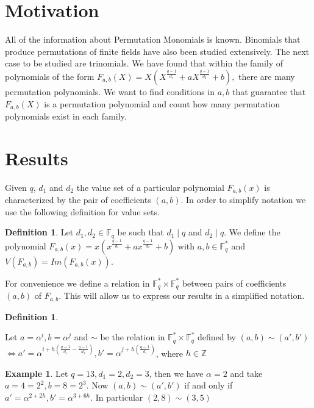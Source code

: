\documentclass{article}
\theoremstyle{definition}
\newtheorem{definition}[theorem]{Definition}
\newtheorem{example}[theorem]{Example}
\theoremstyle{remark}
\numberwithin{equation}{section}
\begin{document}
\section{Motivation}    

All of the information about Permutation Monomials is known. Binomials that produce permutations of finite fields have also been studied extensively. The next case to be studied are trinomials. We have found that within the family of polynomials of the form $F_{a,b}(X) =X\left(X^{\frac{q-1}{d_1}} + a X^{\frac{q-1}{d_2}} + b \right),$ there are many permutation polynomials. We want to find conditions in $a,b$ that guarantee that $F_{a,b}(X)$ is a permutation polynomial and count how many permutation polynomials exist in each family.

\section{Results}

Given $q$, $d_1$ and $d_2$ the value set of a particular polynomial $F_{a,b}(x)$ is characterized by the pair of coefficients $(a,b)$. In order to simplify notation we use the following definition for value sets.

\begin{definition}
  Let $d_1, d_2 \in \mathbb{F}_q$ be such that $d_1 \mid q$ and $d_2 \mid q$. We define the polynomial $F_{a,b}(x) = x(x^{\frac{q-1}{d_1}} + ax^{\frac{q-1}{d_2}} +b)$ with $a,b \in \mathbb{F}_q^{*}$ and $V(F_{a,b}) = Im(F_{a,b}(x))$.
\end{definition}

For convenience we define a relation in $\mathbb{F}_q^* \times \mathbb{F}_q^*$ between pairs of coefficients $(a,b)$ of $F_{a,b}$. This will allow us to express our results in a simplified notation.

\begin{definition}\label{relacion}

  Let $a = \alpha^i, b = \alpha^j$ and $\sim$ be the relation in $\mathbb{F}_q^* \times \mathbb{F}_q^*$ defined by $(a,b) \sim (a', b')$ 
  $\Longleftrightarrow a' = \alpha^{i+h(\frac{q-1}{d_1} - \frac{q-1}{d_2})}, b' = \alpha^{j+h(\frac{q-1}{d_1})}$, where $h \in \mathbb{Z}$

\end{definition}

 \begin{example}
    Let $q = 13, d_1 = 2, d_2 = 3$, then we have $\alpha = 2$ and take $a = 4 = 2^2, b = 8 = 2^3$. Now $(a,b) \sim (a',b')$ if and only if
    $a' = \alpha^{2+2h}, b' = \alpha^{3+6h}$. In particular $(2,8) \sim (3,5)$
  \end{example}
\end{document}
